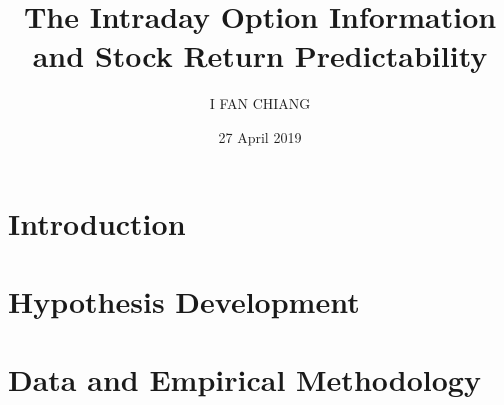 \documentclass[oneside,12pt]{article}
\title{\textbf{The Intraday Option Information and Stock Return Predictability}}
\author{I FAN CHIANG}
\date{27 April 2019}
\begin{document}
\maketitle

\begin{abstract}
\centering

\end{abstract}


\section{Introduction}




\section{Hypothesis Development}



\section{Data and Empirical Methodology}




\newpage
\printbibliography
\end{document}
